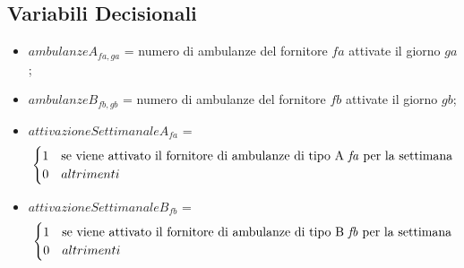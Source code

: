 \subsection{Variabili Decisionali}
\begin{itemize}
    \item $ambulanzeA_{fa, ga}$ = numero di ambulanze del fornitore $fa$ attivate il giorno $ga$;
    \item $ambulanzeB_{fb, gb}$ =  numero di ambulanze del fornitore $fb$ attivate il giorno $gb$;
    \item $attivazioneSettimanaleA_{fa}$ = 
    \[
    \begin{cases}
        1 & \text{se viene attivato il fornitore di ambulanze di tipo A \textit{fa} per la settimana} \\
        0 & altrimenti
    \end{cases}\]
    \item $attivazioneSettimanaleB_{fb}$ = 
    \[
    \begin{cases}
        1 & \text{se viene attivato il fornitore di ambulanze di tipo B \textit{fb} per la settimana} \\
        0 & altrimenti
    \end{cases}\]
\end{itemize}

